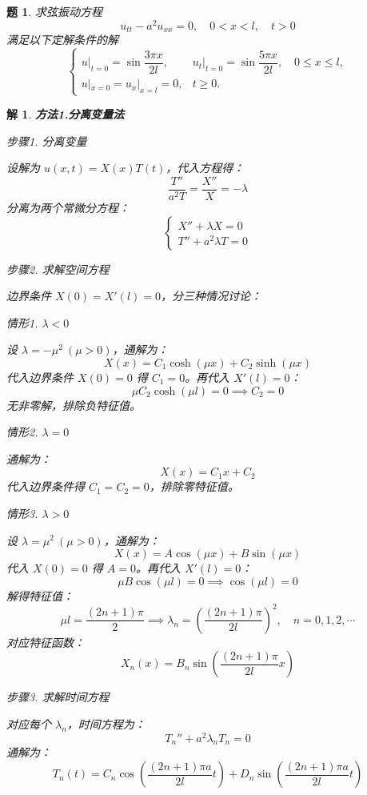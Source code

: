 \documentclass[12pt,a4paper]{article}
\newtheorem{problem}{题}
\newtheorem*{solution}{解}
\begin{document}
\newpage
\begin{problem}
	求弦振动方程
	\[
	u_{tt} - a^2 u_{xx} = 0, \quad 0 < x < l, \quad t > 0
	\]
	满足以下定解条件的解
	\[
	\begin{cases}
		u|_{t=0} = \sin \dfrac{3\pi x}{2l}, & u_t |_{t=0} = \sin \dfrac{5\pi x}{2l}, \quad 0 \leq x \leq l, \\
		u|_{x=0} = u_x |_{x=l} = 0, & t \geq 0.
	\end{cases}
	\]
\end{problem}

	
\begin{solution}
	\textbf{方法1.分离变量法}
	
	步骤1. 分离变量
		
	\noindent
	设解为 \( u(x,t) = X(x)T(t) \)，代入方程得：
	\[
	\frac{T''}{a^2 T} = \frac{X''}{X} = -\lambda
	\]
	分离为两个常微分方程：
	\[
	\begin{cases}
		X'' + \lambda X = 0 \\
		T'' + a^2 \lambda T = 0
	\end{cases}
	\]
	
	步骤2. 求解空间方程
		
	\noindent
	边界条件 \( X(0) = X'(l) = 0 \)，分三种情况讨论：
		
	\noindent
	情形1. \(\lambda < 0\)
		
	\noindent
	设 \(\lambda = -\mu^2\ (\mu > 0)\)，通解为：
	\[
	X(x) = C_1 \cosh(\mu x) + C_2 \sinh(\mu x)
	\]
	代入边界条件 \( X(0) = 0 \) 得 \( C_1 = 0 \)。再代入 \( X'(l) = 0 \)：
	\[
	\mu C_2 \cosh(\mu l) = 0 \implies C_2 = 0
	\]
	无非零解，排除负特征值。
		
	\noindent
	情形2. \(\lambda = 0\)
		
	\noindent
	通解为：
	\[
	X(x) = C_1 x + C_2
	\]
	代入边界条件得 \( C_1 = C_2 = 0 \)，排除零特征值。
		
	\noindent
	情形3. \(\lambda > 0\)
		
	\noindent
	设 \(\lambda = \mu^2\ (\mu > 0)\)，通解为：
	\[
	X(x) = A \cos(\mu x) + B \sin(\mu x)
	\]
	代入 \( X(0) = 0 \) 得 \( A = 0 \)。再代入 \( X'(l) = 0 \)：
	\[
	\mu B \cos(\mu l) = 0 \implies \cos(\mu l) = 0
	\]
	解得特征值：
	\[
	\mu l = \frac{(2n+1)\pi}{2} \implies \lambda_n = \left( \frac{(2n+1)\pi}{2l} \right)^2,\quad n=0,1,2,\cdots
	\]
	对应特征函数：
	\[
	X_n(x) = B_n\sin\left( \frac{(2n+1)\pi}{2l} x \right)
	\]
	
	步骤3. 求解时间方程
		
	\noindent
	对应每个 \(\lambda_n\)，时间方程为：
	\[
	T_n'' + a^2 \lambda_n T_n = 0
	\]
	通解为：
	\[
	T_n(t) = C_n \cos\left( \frac{(2n+1)\pi a}{2l} t \right) + D_n \sin\left( \frac{(2n+1)\pi a}{2l} t \right)
	\]
	

\end{solution}
\end{document}
